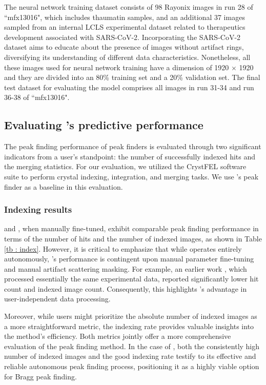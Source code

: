 \documentclass[a4paper]{article}
\begin{document}
The neural network training dataset consists of 98 Rayonix images in run 28 of
``mfx13016", which includes thaumatin samples, and an additional 37 images
sampled from an internal LCLS experimental dataset related to therapeutics
development associated with SARS-CoV-2.  Incorporating the SARS-CoV-2 dataset
aims to educate \peaknet{} about the presence of images without artifact rings,
diversifying its understanding of different data characteristics.  Nonetheless,
all these images used for neural network training have a dimension of 1920
$\times$ 1920 and they are divided into an 80\% training set and a 20\%
validation set.  The final test dataset for evaluating the model comprises all
images in run 31-34 and run 36-38 of ``mfx13016".


\subsection{Evaluating \peaknet{}'s predictive performance}

The peak finding performance of peak finders is evaluated through two
significant indicators from a user's standpoint: the number of successfully
indexed hits and the merging statistics.  For our evaluation, we utilized the
CrystFEL software suite \citep{whiteCrystFELSoftwareSuite2012} to perform
crystal indexing, integration, and merging tasks.  We use \psocake{}'s peak
finder as a baseline in this evaluation.

\subsubsection{Indexing results}

\peaknet{} and \psocake{}, when manually fine-tuned, exhibit comparable peak
finding performance in terms of the number of hits and the number of indexed
images, as shown in Table \ref{tb : index}.  However, it is critical to
emphasize that while \peaknet{} operates entirely autonomously, \psocake{}'s
performance is contingent upon manual parameter fine-tuning and manual artifact
scattering masking.  For example, an earlier work
\citep{suSerialCrystallographyUsing2021}, which processed essentially the same
experimental data, reported significantly lower hit count and indexed image
count.  Consequently, this highlights \peaknet{}'s advantage in user-independent
data processing.

Moreover, while users might prioritize the absolute number of indexed images as
a more straightforward metric, the indexing rate provides valuable insights into
the method's efficiency.  Both metrics jointly offer a more comprehensive
evaluation of the peak finding method. In the case of \peaknet{}, both the
consistently high number of indexed images and the good indexing rate testify to
its effective and reliable autonomous peak finding process, positioning it as a
highly viable option for Bragg peak finding.
\end{document}
